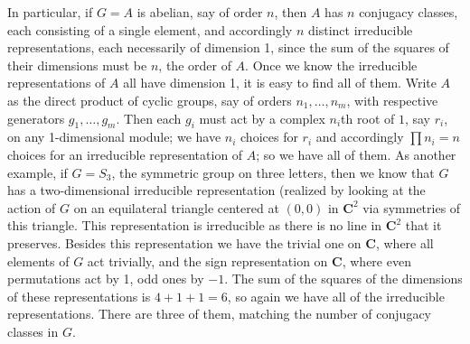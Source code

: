 \documentclass[10pt]{article}
\begin{document}
In particular, if $G=A$ is abelian, say of order $n$, then $A$ has $n$
conjugacy classes, each consisting of a single element, and accordingly
$n$ distinct irreducible representations, each necessarily of dimension
1, since the sum of the squares of their dimensions must be $n$, the
order of $A$. Once we know the irreducible representations of $A$ all
have dimension 1, it is easy to find all of them. Write $A$ as the
direct product of cyclic groups, say of orders $n_1,\ldots,n_m$, with
respective generators $g_1,\ldots,g_m$. Then each $g_i$ must act by a
complex $n_i$th root of $1$, say $r_i$, on any 1-dimensional module; we
have $n_i$ choices for $r_i$ and accordingly $\prod n_i = n$ choices for
an irreducible representation of $A$; so we have all of them. As another
example, if $G=S_3$, the symmetric group on three letters, then we know
that $G$ has a two-dimensional irreducible representation (realized by
looking at the action of $G$ on an equilateral triangle centered at
$(0,0)$ in $\mathbf C^2$ via symmetries of this triangle. This
representation is irreducible as there is no line in $\mathbf C^2$ that
it preserves. Besides this representation we have the trivial one on
$\mathbf C$, where all elements of $G$ act trivially, and the sign
representation on $\mathbf C$, where even permutations act by 1, odd
ones by $-1$. The sum of the squares of the dimensions of these
representations is $4+1+1= 6$, so again we have all of the irreducible
representations. There are three of them, matching the number of
conjugacy classes in $G$.
\end{document}
